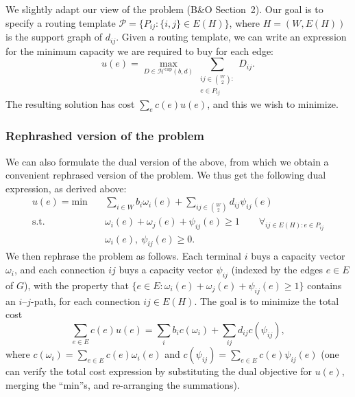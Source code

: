 \documentclass[11pt]{article}
\begin{document}
    We slightly adapt our view of the problem (B\&O Section~2).
    Our goal is to specify a routing template $\mathcal P = \{ P_{ij} : \{i, j\} \in E(H) \}$, where $H = (W, E(H))$ is the support graph of $d_{ij}$.
    Given a routing template, we can write an expression for the minimum capacity we are required to buy for each edge:
    \[
        u(e) = \max_{D \in \mathcal H^\text{cap}(b, d)} \sum_{\substack{ij \in \binom W 2 :\\e \in P_{ij}}} D_{ij}.
    \]
    The resulting solution has cost $\sum_e c(e) u(e)$, and this we wish to minimize.

    \subsubsection*{Rephrashed version of the problem}
    We can also formulate the dual version of the above, from which we obtain a convenient rephrased version of the problem.
    We thus get the following dual expression, as derived above:
    \[
        \begin{split}
            u(e) = \text{min}\quad & \sum_{i \in W} b_i \omega_i(e) + \sum_{ij \in \binom W 2} d_{ij} \psi_{ij}(e) \\
            \text{s.t.}\quad & \omega_i(e) + \omega_j(e) + \psi_{ij}(e) \ge 1 \qquad \forall_{ij \in E(H) : e \in P_{ij}} \\
            & \omega_i(e),\ \psi_{ij}(e) \ge 0.
        \end{split}
    \]
    We then rephrase the problem as follows.
    Each terminal $i$ buys a capacity vector $\omega_i$, and each connection $ij$ buys a capacity vector $\psi_{ij}$ (indexed by the edges $e \in E$ of $G$), with the property that $\{ e \in E : \omega_i(e) + \omega_j(e) + \psi_{ij}(e) \ge 1 \}$ contains an $i$--$j$-path, for each connection $ij \in E(H)$.
    The goal is to minimize the total cost
    \[
        \sum_{e \in E} c(e) u(e) = \sum_{i} b_i c(\omega_i) + \sum_{ij} d_{ij} c(\psi_{ij}),
    \]
    where $c(\omega_i) = \sum_{e \in E} c(e) \omega_i(e)$ and $c(\psi_{ij}) = \sum_{e \in E} c(e) \psi_{ij}(e)$ (one can verify the total cost expression by substituting the dual objective for $u(e)$, merging the ``min''s, and re-arranging the summations).
\end{document}
